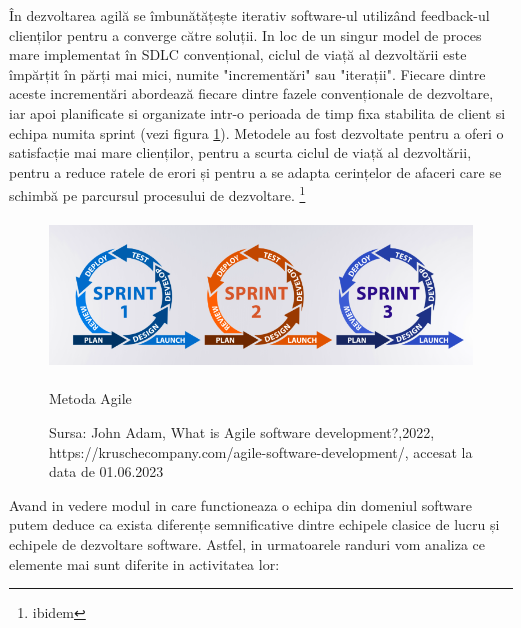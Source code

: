 \documentclass[a4paper, 12pt]{article}
\begin{document}
	\quad În dezvoltarea agilă se îmbunătățește iterativ software-ul utilizând feedback-ul clienților pentru a converge către soluții. In loc de un singur model de proces mare implementat în SDLC convențional, ciclul de viață al dezvoltării este împărțit în părți mai mici, numite "incrementări" sau "iterații". Fiecare dintre aceste incrementări abordează fiecare dintre fazele convenționale de dezvoltare, iar apoi planificate si organizate intr-o perioada de timp fixa stabilita de client si echipa numita sprint (vezi figura \ref{fig:two}). Metodele au fost dezvoltate pentru a oferi o satisfacție mai mare clienților, pentru a scurta ciclul de viață al dezvoltării, pentru a reduce ratele de erori și pentru a se adapta cerințelor de afaceri care se schimbă pe parcursul procesului de dezvoltare. \footnote{ibidem}

\begin{figure}[!htb]
			\centering
			\includegraphics[width=14cm, height=4cm]{"figures/sprint.png"}
			\caption {Metoda Agile}\label{fig:two}
			\caption*{Sursa: John Adam, What is Agile software development?,2022, https://kruschecompany.com/agile-software-development/, accesat la data de 01.06.2023}
		\end{figure}

	\quad\quad Avand in vedere modul in care functioneaza o echipa din domeniul software putem deduce ca  exista diferențe semnificative dintre echipele clasice de lucru și echipele de dezvoltare software. Astfel, in urmatoarele randuri vom analiza ce elemente mai sunt diferite in activitatea lor:
\end{document}

